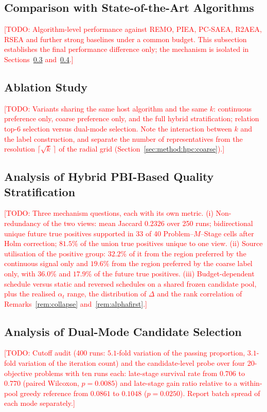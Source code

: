 \documentclass[final,5p,times,twocolumn]{elsarticle}
\newcommand{\TODO}[1]{\textcolor{red}{[TODO: #1]}}
\begin{document}
\subsection{Comparison with State-of-the-Art Algorithms}
\label{sec:exp:comparison}
\TODO{Algorithm-level performance against REMO, PIEA, PC-SAEA, R2AEA, RSEA and
further strong baselines under a common budget. This subsection establishes the
final performance difference only; the mechanism is isolated in
Sections~\ref{sec:exp:hpc} and~\ref{sec:exp:candidate}.}

\subsection{Ablation Study}
\label{sec:exp:ablation}
\TODO{Variants sharing the same host algorithm and the same $k$: continuous
preference only, coarse preference only, and the full hybrid stratification;
relation top-$6$ selection versus dual-mode selection. Note the interaction
between $k$ and the label construction, and separate the number of
representatives from the resolution $\lceil\sqrt{k}\,\rceil$ of the radial grid
(Section~\ref{sec:method:hpc:coarse}).}

\subsection{Analysis of Hybrid PBI-Based Quality Stratification}
\label{sec:exp:hpc}
\TODO{Three mechanism questions, each with its own metric. (i) Non-redundancy of
the two views: mean Jaccard $0.2326$ over 250 runs; bidirectional unique future
true positives supported in 33 of 40 Problem--$M$--Stage cells after Holm
correction; $81.5\%$ of the union true positives unique to one view.
(ii) Source utilisation of the positive group: $32.2\%$ of it from the region
preferred by the continuous signal only and $19.6\%$ from the region preferred
by the coarse label only, with $36.0\%$ and $17.9\%$ of the future true
positives. (iii) Budget-dependent schedule versus static and reversed schedules
on a shared frozen candidate pool, plus the realised $\alpha_t$ range, the
distribution of $\Delta$ and the rank correlation of
Remarks~\ref{rem:collapse} and~\ref{rem:alphafirst}.}

\subsection{Analysis of Dual-Mode Candidate Selection}
\label{sec:exp:candidate}
\TODO{Cutoff audit (400 runs: $5.1$-fold variation of the passing proportion,
$3.1$-fold variation of the iteration count) and the candidate-level probe over
four 20-objective problems with ten runs each: late-stage survival rate from
$0.706$ to $0.770$ (paired Wilcoxon, $p=0.0085$) and late-stage gain ratio
relative to a within-pool greedy reference from $0.0861$ to $0.1048$
($p=0.0250$). Report batch spread of each mode separately.}
\end{document}

